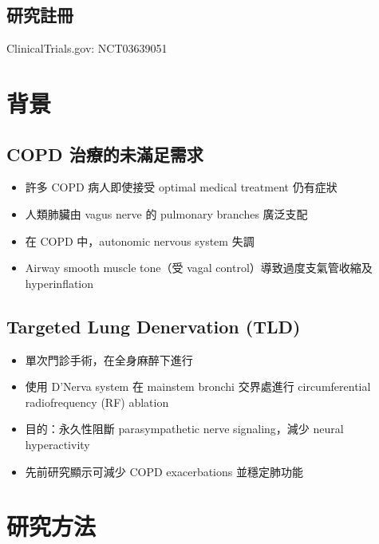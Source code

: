 \documentclass[12pt,a4paper]{article}
\begin{document}
\subsection{研究註冊}
ClinicalTrials.gov: NCT03639051

\section{背景}

\subsection{COPD 治療的未滿足需求}

\begin{itemize}
    \item 許多 COPD 病人即使接受 optimal medical treatment 仍有症狀
    \item 人類肺臟由 vagus nerve 的 pulmonary branches 廣泛支配
    \item 在 COPD 中，autonomic nervous system 失調
    \item Airway smooth muscle tone（受 vagal control）導致過度支氣管收縮及 hyperinflation
\end{itemize}

\subsection{Targeted Lung Denervation (TLD)}

\begin{itemize}
    \item 單次門診手術，在全身麻醉下進行
    \item 使用 D'Nerva system 在 mainstem bronchi 交界處進行 circumferential radiofrequency (RF) ablation
    \item 目的：永久性阻斷 parasympathetic nerve signaling，減少 neural hyperactivity
    \item 先前研究顯示可減少 COPD exacerbations 並穩定肺功能
\end{itemize}

\section{研究方法}
\end{document}
